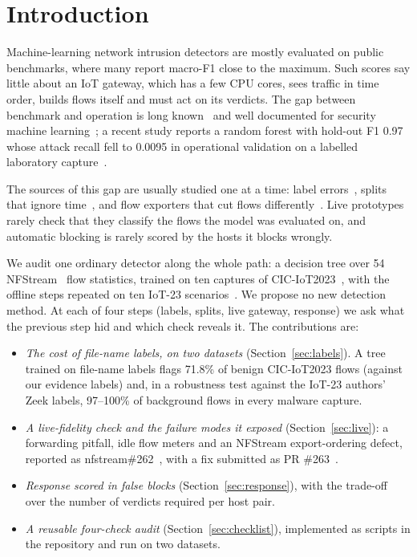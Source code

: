 \section{Introduction}\label{sec:intro}

Machine-learning network intrusion detectors are mostly evaluated on public benchmarks, where many report macro-F1 close to the maximum. Such scores say little about an IoT gateway, which has a few CPU cores, sees traffic in time order, builds flows itself and must act on its verdicts. The gap between benchmark and operation is long known~\cite{sommer2010outside} and well documented for security machine learning~\cite{arp2022dos,apruzzese2023sok}; a recent study reports a random forest with hold-out F1 0.97 whose attack recall fell to 0.0095 in operational validation on a labelled laboratory capture~\cite{tang2026hybrid}.

The sources of this gap are usually studied one at a time: label errors~\cite{engelen2021troubleshooting,liu2022error,flood2024smells}, splits that ignore time~\cite{pendlebury2019tesseract,arp2022dos}, and flow exporters that cut flows differently~\cite{pinto2025flowexporter,vitorino2025revisiting}. Live prototypes rarely check that they classify the flows the model was evaluated on, and automatic blocking is rarely scored by the hosts it blocks wrongly.

We audit one ordinary detector along the whole path: a decision tree over 54 NFStream~\cite{aouini2022nfstream} flow statistics, trained on ten captures of CIC-IoT2023~\cite{neto2023ciciot2023}, with the offline steps repeated on ten IoT-23 scenarios~\cite{garcia2020iot23}. We propose no new detection method. At each of four steps (labels, splits, live gateway, response) we ask what the previous step hid and which check reveals it. The contributions are:
\begin{itemize}
\item \emph{The cost of file-name labels, on two datasets} (Section~\ref{sec:labels}). A tree trained on file-name labels flags 71.8\% of benign CIC-IoT2023 flows (against our evidence labels) and, in a robustness test against the IoT-23 authors' Zeek labels, 97--100\% of background flows in every malware capture.
\item \emph{A live-fidelity check and the failure modes it exposed} (Section~\ref{sec:live}): a forwarding pitfall, idle flow meters and an NFStream export-ordering defect, reported as nfstream\#262~\cite{nfstream262}, with a fix submitted as PR \#263~\cite{nfstream263}.
\item \emph{Response scored in false blocks} (Section~\ref{sec:response}), with the trade-off over the number of verdicts required per host pair.
\item \emph{A reusable four-check audit} (Section~\ref{sec:checklist}), implemented as scripts in the repository and run on two datasets.
\end{itemize}
